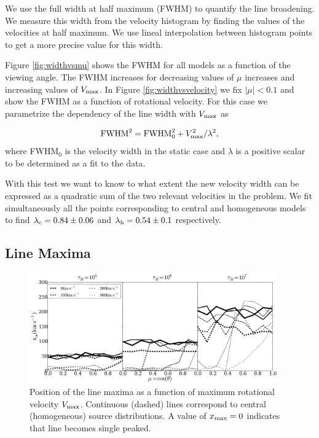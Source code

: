 \documentclass{emulateapj}
\begin{document}
We use the full width at half maximum (FWHM) to quantify the line
broadening. We measure this width from the velocity histogram by
finding the values of the velocities at half maximum. We use lineal
interpolation between histogram points to get a more precise value for
this width.

Figure \ref{fig:widthvsmu} shows the FWHM for all models as a function
of the viewing angle. The FWHM increases for decreasing values of
$\mu$ increases and increasing values of $V_{\rm max}$. In Figure
\ref{fig:widthvsvelocity} we fix $|\mu|<0.1$ and show the FWHM as a
function of rotational velocity. For this case we parametrize the
dependency of the line width with  $V_{\rm max}$ as

\begin{equation}
 {\rm FWHM}^2 = {\rm FWHM}_{0}^2 + V_{\rm max}^2/\lambda^2,
\label{eq:fwhm}
\end{equation}
%
where FWHM$_{0}$ is the velocity width in the static case and $\lambda$ 
is a positive scalar to be determined as a fit to the data. 

With this test we want to know to what extent the new velocity width
can be expressed as a quadratic sum of the two relevant velocities in
the problem. We fit simultaneously all the points corresponding to
central and homogeneous models to find $\lambda_{\rm c} = 0.84 \pm
0.06$ and $\lambda_{\rm h}= 0.54\pm 0.1$ respectively. 


\subsection{Line Maxima}
\label{sec:maxima}

\begin{figure}
\begin{center}
  \includegraphics[width=0.95\textwidth]{f8.pdf}
\end{center}
\caption{Position of the line maxima as a function of maximum
  rotational   velocity $V_{\rm max}$. Continuous (dashed) lines
  correspond to   central (homogeneous) source distributions. A value
  of $x_{\rm     max}=0$ indicates that line becomes single
  peaked. \label{fig:maximumsvsvelocity}}
\end{figure}
\end{document}
